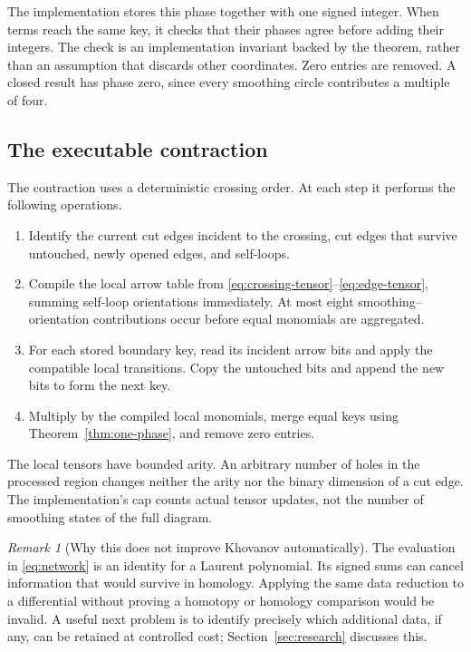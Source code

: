 \documentclass[11pt]{article}
\theoremstyle{definition}
\theoremstyle{remark}
\newtheorem{remark}[theorem]{Remark}
\begin{document}
The implementation stores this phase together with one signed integer.
When terms reach the same key, it checks that their phases agree before
adding their integers. The check is an implementation invariant backed by
the theorem, rather than an assumption that discards other coordinates.
Zero entries are removed. A closed result has phase zero, since every
smoothing circle contributes a multiple of four.

\subsection{The executable contraction}

The contraction uses a deterministic crossing order. At each step it
performs the following operations.
\begin{enumerate}
\item Identify the current cut edges incident to the crossing, cut edges
that survive untouched, newly opened edges, and self-loops.
\item Compile the local arrow table from
\eqref{eq:crossing-tensor}--\eqref{eq:edge-tensor}, summing self-loop
orientations immediately. At most eight smoothing--orientation
contributions occur before equal monomials are aggregated.
\item For each stored boundary key, read its incident arrow bits and
apply the compatible local transitions. Copy the untouched bits and
append the new bits to form the next key.
\item Multiply by the compiled local monomials, merge equal keys using
Theorem~\ref{thm:one-phase}, and remove zero entries.
\end{enumerate}
The local tensors have bounded arity. An arbitrary number of holes in the
processed region changes neither the arity nor the binary dimension of a
cut edge. The implementation's cap counts actual tensor updates, not the
number of smoothing states of the full diagram.

\begin{remark}[Why this does not improve Khovanov automatically]
The evaluation in \eqref{eq:network} is an identity for a Laurent
polynomial. Its signed sums can cancel information that would survive in
homology. Applying the same data reduction to a differential without
proving a homotopy or homology comparison would be invalid. A useful next
problem is to identify precisely which additional data, if any, can be
retained at controlled cost; Section~\ref{sec:research} discusses this.
\end{remark}
\end{document}
